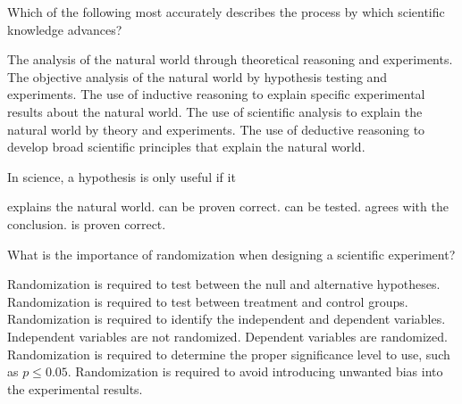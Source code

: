 \question
Which of the following most accurately describes the process by which scientific knowledge advances? 

\begin{choices}
\choice The analysis of the natural world through theoretical reasoning and experiments.
\correctchoice The objective analysis of the natural world by hypothesis testing and experiments.
\choice The use of inductive reasoning to explain specific experimental results about the natural world.
\choice The use of scientific analysis to explain the natural world by theory and experiments.
\choice The use of deductive reasoning to develop broad scientific principles that explain the natural world.
\end{choices}

\newpage

\question
In science, a hypothesis is only useful if it

\begin{choices}
\choice explains the natural world.
\choice can be proven correct.
\correctchoice can be tested.
\choice agrees with the conclusion.
\choice is proven correct.
\end{choices}

\question
What is the importance of randomization when designing a scientific experiment?

\begin{choices}
\choice Randomization is required to test between the null and alternative hypotheses.
\choice Randomization is required to test between treatment and control groups.
\choice Randomization is required to identify the independent and dependent variables. Independent variables are not randomized. Dependent variables are randomized.
\choice Randomization is required to determine the proper significance level to use, such as $p \le 0.05$.
\correctchoice Randomization is required to avoid introducing unwanted bias into the experimental results.
\end{choices}
